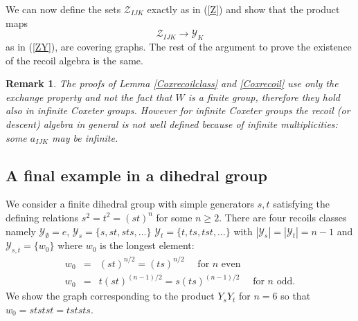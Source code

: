 \documentclass[11pt,a4paper]{amsart}
\theoremstyle{contraction}
\newtheorem{rem}[theorem]{Remark}
\begin{document}
We can now define the sets ${\mathcal Z}_{IJK}$ exactly as in (\ref{Z}) and show that the product maps
$${\mathcal Z}_{IJK}\to {\mathcal Y}_{K}$$ as in (\ref{ZY}), are covering graphs. The rest of the argument to prove the existence of the recoil algebra is the same.

\begin{rem} The proofs of Lemma  \ref{Coxrecoilclass} and  \ref{Coxrecoil} use only the exchange property and not the fact that $W$ is a finite group, therefore they hold also in infinite Coxeter groups. However for infinite Coxeter groups the recoil (or descent) algebra in general is not well defined because of infinite multiplicities: some $a_{IJK}$ may be infinite.
\end{rem}
\subsection{A final example in a dihedral group}
We consider a finite dihedral group with simple generators $s,t$ satisfying the defining relations $s^2=t^2=(st)^n$ for some $n\geq 2$. There are four recoils classes namely ${\mathcal Y}_{\emptyset}=e$, ${\mathcal Y}_{s}=\{s,st,sts,\ldots\}$
${\mathcal Y}_{t}=\{t,ts,tst,\ldots\}$ with $|{\mathcal Y}_{s}|=|{\mathcal Y}_{t}|=n-1$ and ${\mathcal Y}_{s,t}=\{w_0\}$ where $w_0$  is the longest element: 
$$
\begin{array}{rcl}
w_0&=&(st)^{n/2}=(ts)^{n/2}\quad\text{ for $n$ even} \\ w_0&=&t(st)^{(n-1)/2}=s(ts)^{(n-1)/2}\quad\text{ for $n$  odd.}
\end{array}
$$
We show the graph corresponding to the product $Y_{s}Y_{t}$  for $n=6$ so that $w_0=ststst=tststs$.

\medskip
\end{document}
